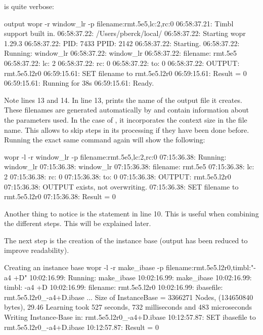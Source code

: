 \documentclass[a4paper,10pt,twoside]{report}
\begin{document}
\Wopr{} is quite verbose:

\begin{bash}{\Wopr{} output}
wopr -r window_lr -p filename:rmt.5e5,lc:2,rc:0
06:58:37.21: Timbl support built in.
06:58:37.22: /Users/pberck/local/
06:58:37.22: Starting wopr 1.29.3
06:58:37.22: PID:   7433 PPID:   2142
06:58:37.22: Starting.
06:58:37.22: Running: window_lr
06:58:37.22: window_lr
06:58:37.22:  filename:  rmt.5e5
06:58:37.22:  lc:        2
06:58:37.22:  rc:        0
06:58:37.22:  to:        0
06:58:37.22:  OUTPUT:    rmt.5e5.l2r0
06:59:15.61: SET filename to rmt.5e5.l2r0
06:59:15.61: Result = 0
06:59:15.61: Running for 38s
06:59:15.61: Ready.
\end{bash}

Note lines 13 and 14. In line 13, \wopr{} prints the name of the
output file it creates. These filenames are generated automatically by
\wopr{} and contain information about the parameters used. In the case
of , it incorporates the context size in the file
name. This allows \wopr{} to skip steps in its processing if they have
been done before. Running the exact same command again will show the
following:

\begin{bash}{}
wopr -l -r window_lr -p filename:rmt.5e5,lc:2,rc:0
07:15:36.38: Running: window_lr
07:15:36.38: window_lr
07:15:36.38:  filename:  rmt.5e5
07:15:36.38:  lc:        2
07:15:36.38:  rc:        0
07:15:36.38:  to:        0
07:15:36.38:  OUTPUT:    rmt.5e5.l2r0
07:15:36.38: OUTPUT exists, not overwriting.
07:15:36.38: SET filename to rmt.5e5.l2r0
07:15:36.38: Result = 0
\end{bash}

Another thing to notice is the  statement in line
\num{10}. This is useful when combining the different steps. This will
be explained later.

The next step is the creation of the instance base (output has been
reduced to improve readability).

\begin{bash}{Creating an instance base}
wopr -l -r make_ibase -p filename:rmt.5e5.l2r0,timbl:"-a4 +D"
10:02:16.99: Running: make_ibase
10:02:16.99: make_ibase
10:02:16.99:  timbl:     -a4 +D
10:02:16.99:  filename:  rmt.5e5.l2r0
10:02:16.99:  ibasefile: rmt.5e5.l2r0_-a4+D.ibase
...
Size of InstanceBase = 3366271 Nodes, (134650840 bytes), 29.46 %
Learning took 527 seconds, 732 milliseconds and 483 microseconds
Writing Instance-Base in: rmt.5e5.l2r0_-a4+D.ibase
10:12:57.87: SET ibasefile to rmt.5e5.l2r0_-a4+D.ibase
10:12:57.87: Result = 0
\end{bash}
\end{document}
